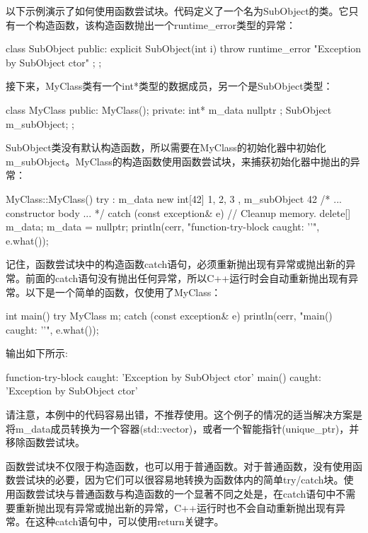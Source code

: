 以下示例演示了如何使用函数尝试块。代码定义了一个名为SubObject的类。它只有一个构造函数，该构造函数抛出一个runtime\_error类型的异常：

\begin{cpp}
class SubObject
{
    public:
        explicit SubObject(int i) {
            throw runtime_error { "Exception by SubObject ctor" }; }
};
\end{cpp}

接下来，MyClass类有一个int*类型的数据成员，另一个是SubObject类型：

\begin{cpp}
class MyClass
{
    public:
        MyClass();
    private:
        int* m_data { nullptr };
        SubObject m_subObject;
};
\end{cpp}

SubObject类没有默认构造函数，所以需要在MyClass的初始化器中初始化m\_subObject。MyClass的构造函数使用函数尝试块，来捕获初始化器中抛出的异常：

\begin{cpp}
MyClass::MyClass()
try
    : m_data { new int[42]{ 1, 2, 3 } }, m_subObject { 42 }
{
    /* ... constructor body ... */
}
catch (const exception& e)
{
    // Cleanup memory.
    delete[] m_data;
    m_data = nullptr;
    println(cerr, "function-try-block caught: '{}'", e.what());
}
\end{cpp}

记住，函数尝试块中的构造函数catch语句，必须重新抛出现有异常或抛出新的异常。前面的catch语句没有抛出任何异常，所以C++运行时会自动重新抛出现有异常。以下是一个简单的函数，仅使用了MyClass：

\begin{cpp}
int main()
{
    try {
        MyClass m;
    } catch (const exception& e) {
        println(cerr, "main() caught: '{}'", e.what());
    }
}
\end{cpp}

输出如下所示:

\begin{shell}
function-try-block caught: 'Exception by SubObject ctor'
main() caught: 'Exception by SubObject ctor'
\end{shell}

请注意，本例中的代码容易出错，不推荐使用。这个例子的情况的适当解决方案是将m\_data成员转换为一个容器(std::vector)，或者一个智能指针(unique\_ptr)，并移除函数尝试块。

函数尝试块不仅限于构造函数，也可以用于普通函数。对于普通函数，没有使用函数尝试块的必要，因为它们可以很容易地转换为函数体内的简单try/catch块。使用函数尝试块与普通函数与构造函数的一个显著不同之处是，在catch语句中不需要重新抛出现有异常或抛出新的异常，C++运行时也不会自动重新抛出现有异常。在这种catch语句中，可以使用return关键字。

